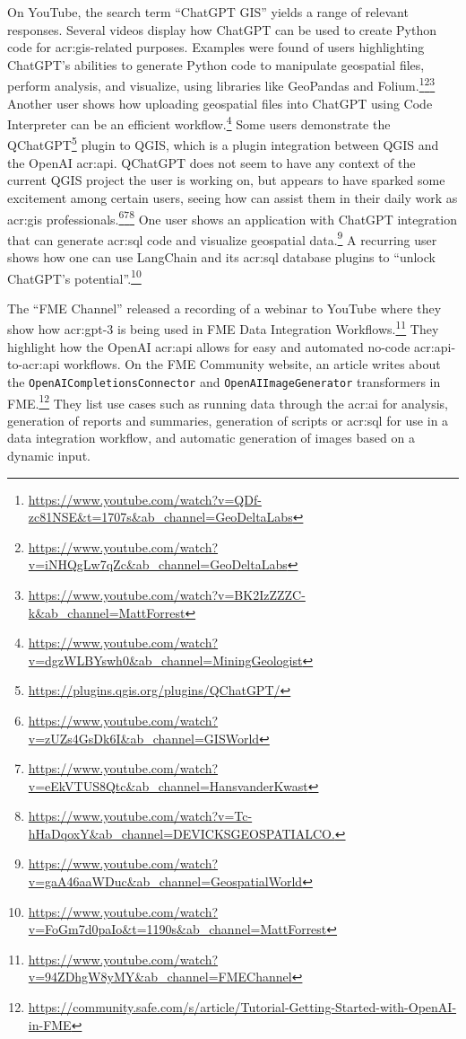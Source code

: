 On YouTube, the search term \enquote{ChatGPT GIS} yields a range of relevant responses. Several videos display how ChatGPT can be used to create Python code for \acrshort{acr:gis}-related purposes. Examples were found of users highlighting ChatGPT's abilities to generate Python code to manipulate geospatial files, perform analysis, and visualize, using libraries like GeoPandas and Folium.\footnote{\url{https://www.youtube.com/watch?v=QDf-zc81NSE&t=1707s&ab_channel=GeoDeltaLabs}}\footnote{\url{https://www.youtube.com/watch?v=iNHQgLw7qZc&ab_channel=GeoDeltaLabs}}\footnote{\url{https://www.youtube.com/watch?v=BK2IzZZZC-k&ab_channel=MattForrest}} Another user shows how uploading geospatial files into ChatGPT using Code Interpreter can be an efficient workflow.\footnote{\url{https://www.youtube.com/watch?v=dgzWLBYswh0&ab_channel=MiningGeologist}} Some users demonstrate the QChatGPT\footnote{\url{https://plugins.qgis.org/plugins/QChatGPT/}} plugin to QGIS, which is a plugin integration between QGIS and the OpenAI \acrshort{acr:api}. QChatGPT does not seem to have any context of the current QGIS project the user is working on, but appears to have sparked some excitement among certain users, seeing how  can assist them in their daily work as \acrshort{acr:gis} professionals.\footnote{\url{https://www.youtube.com/watch?v=zUZs4GsDk6I&ab_channel=GISWorld}}\footnote{\url{https://www.youtube.com/watch?v=eEkVTUS8Qtc&ab_channel=HansvanderKwast}}\footnote{\url{https://www.youtube.com/watch?v=Tc-hHaDqoxY&ab_channel=DEVICKSGEOSPATIALCO.}} One user shows an application with ChatGPT integration that can generate \acrshort{acr:sql} code and visualize geospatial data.\footnote{\url{https://www.youtube.com/watch?v=gaA46aaWDuc&ab_channel=GeospatialWorld}} A recurring user shows how one can use LangChain and its \acrshort{acr:sql} database plugins to \enquote{unlock ChatGPT's potential}.\footnote{\url{https://www.youtube.com/watch?v=FoGm7d0paIo&t=1190s&ab_channel=MattForrest}}

The \enquote{FME Channel} released a recording of a webinar to YouTube where they show how \acrshort{acr:gpt}-3 is being used in FME Data Integration Workflows.\footnote{\url{https://www.youtube.com/watch?v=94ZDhgW8yMY&ab_channel=FMEChannel}} They highlight how the OpenAI \acrshort{acr:api} allows for easy and automated no-code \acrshort{acr:api}-to-\acrshort{acr:api} workflows. On the FME Community website, an article writes about the \texttt{OpenAICompletionsConnector} and \texttt{OpenAIImageGenerator} transformers in FME.\footnote{\url{https://community.safe.com/s/article/Tutorial-Getting-Started-with-OpenAI-in-FME}} They list use cases such as running data through the \acrshort{acr:ai} for analysis, generation of reports and summaries, generation of scripts or \acrshort{acr:sql} for use in a data integration workflow, and automatic generation of images based on a dynamic input.

